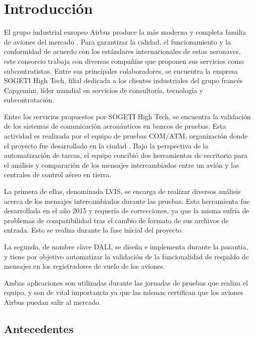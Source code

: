 \chapter*{Introducción} \label{sec:Introduccion}
\vspace{5 mm}

El grupo industrial europeo Airbus produce la más moderna y completa familia de aviones del mercado \cite{INTRO-AIRBUS-ACERCA}. Para garantizar la calidad, el funcionamiento y la conformidad de acuerdo con los estándares internacionales de estas aeronaves, este consorcio trabaja con diversas compañías que proponen sus servicios como subcontratistas. Entre sus principales colaboradores, se encuentra la empresa SOGETI High Tech, filial dedicada a los clientes industriales del grupo francés Capgemini, líder mundial en servicios de consultoría, tecnología y subcontratación. \cite{EE-CAPGEMINI-SECTOR} \cite{INTRO-CAPGEMINI-ACERCA} 

Entre los servicios propuestos por SOGETI High Tech, se encuentra la validación de los sistemas de comunicación aeronáuticos en bancos de pruebas. Esta actividad es realizada por el equipo de pruebas COM/ATM, organización donde el proyecto fue desarrollado en la ciudad .  
Bajo la perspectiva de la automatización de tareas, el equipo concibió dos herramientas de escritorio para el análisis y comparación de los mensajes intercambiados entre un avión y las centrales de control aéreo en tierra.

La primera de ellas, denominada LVIS, se encarga de realizar diversos análisis acerca de los mensajes intercambiados durante las pruebas. Esta herramienta fue desarrollada en el año 2015 y requería de correcciones, ya que la misma sufría de problemas de compatibilidad tras el cambio de formato de sus archivos de entrada. Esto se realiza durante la fase inicial del proyecto.

La segunda, de nombre clave DALI, se diseña e implementa durante la pasantía, y tiene por objetivo automatizar la validación de la funcionalidad de respaldo de mensajes en los registradores de vuelo de los aviones. 

Ambas aplicaciones son utilizadas durante las jornadas de pruebas que realiza el equipo, y son de vital importancia ya que las mismas certifican que los aviones Airbus puedan salir al mercado.

\section*{Antecedentes}

